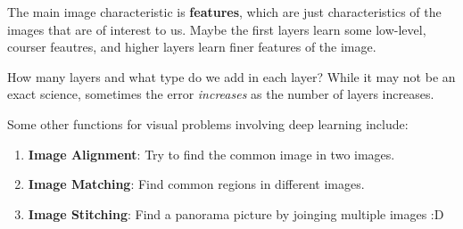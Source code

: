 \documentclass{tufte-handout}
\begin{document}
The main image characteristic is \textbf{features}, which are 
just characteristics of the images that are of interest to us.
Maybe the first layers learn some low-level, courser feautres, and 
higher layers learn finer features of the image.

How many layers and what type do we add in each layer?
While it may not be an exact science, sometimes the error \textit{increases}
as the number of layers increases.

Some other functions for visual problems involving deep learning include:
\begin{enumerate}
	\item \textbf{Image Alignment}: Try to find the common image in two images.
	\item \textbf{Image Matching}: Find common regions in different images.
	\item \textbf{Image Stitching}: Find a panorama picture by joinging multiple images :D 
\end{enumerate}
\end{document}
